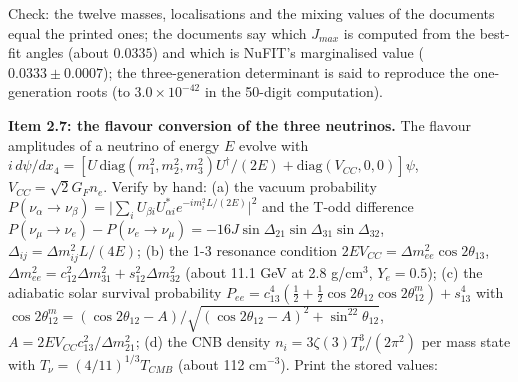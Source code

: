 \documentclass[
  10pt,
]{article}
\begin{document}
Check: the twelve masses, localisations and the mixing values of the
documents equal the printed ones; the documents say which \(J_{max}\) is
computed from the best-fit angles (about \(0.0335\)) and which is
NuFIT's marginalised value (\(0.0333 \pm 0.0007\)); the three-generation
determinant is said to reproduce the one-generation roots (to
\(3.0\times10^{-42}\) in the 50-digit computation).

\textbf{Item 2.7: the flavour conversion of the three neutrinos.} The
flavour amplitudes of a neutrino of energy \(E\) evolve with
\(i\,d\psi/dx_4 = [U\,\mathrm{diag}(m_1^2, m_2^2, m_3^2)U^\dagger/(2E) + \mathrm{diag}(V_{CC}, 0, 0)]\psi\),
\(V_{CC} = \sqrt2G_Fn_e\). Verify by hand: (a) the vacuum probability
\(P(\nu_\alpha\to\nu_\beta) = \lvert\sum_iU_{\beta i}U^*_{\alpha i}e^{-im_i^2L/(2E)}\rvert^2\)
and the T-odd difference
\(P(\nu_\mu\to\nu_e) - P(\nu_e\to\nu_\mu) = -16J\sin\Delta_{21}\sin\Delta_{31}\sin\Delta_{32}\),
\(\Delta_{ij} = \Delta m^2_{ij}L/(4E)\); (b) the 1-3 resonance condition
\(2EV_{CC} = \Delta m^2_{ee}\cos2\theta_{13}\),
\(\Delta m^2_{ee} = c_{12}^2\Delta m^2_{31} + s_{12}^2\Delta m^2_{32}\)
(about 11.1 GeV at 2.8 g/cm\(^3\), \(Y_e = 0.5\)); (c) the adiabatic
solar survival probability
\(P_{ee} = c_{13}^4(\frac12 + \frac12\cos2\theta_{12}\cos2\theta^m_{12}) + s_{13}^4\)
with
\(\cos2\theta^m_{12} = (\cos2\theta_{12} - A)/\sqrt{(\cos2\theta_{12} - A)^2 + \sin^22\theta_{12}}\),
\(A = 2EV_{CC}c_{13}^2/\Delta m^2_{21}\); (d) the CNB density
\(n_i = 3\zeta(3)T_\nu^3/(2\pi^2)\) per mass state with
\(T_\nu = (4/11)^{1/3}T_{CMB}\) (about 112 cm\(^{-3}\)). Print the
stored values:
\end{document}
